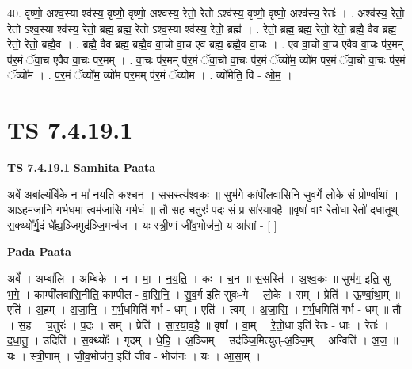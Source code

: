 \documentclass[17pt]{extarticle}
\begin{document}
40. वृष्णो॒ अश्व॒स्या श्व॑स्य॒ वृष्णो॒ वृष्णो॒ अश्व॑स्य॒ रेतो॒ रेतो ऽश्व॑स्य॒ वृष्णो॒ वृष्णो॒ अश्व॑स्य॒ रेतः॑ । . अश्व॑स्य॒ रेतो॒ रेतो ऽश्व॒स्या श्व॑स्य॒ रेतो॒ ब्रह्म॒ ब्रह्म॒ रेतो ऽश्व॒स्या श्व॑स्य॒ रेतो॒ ब्रह्म॑ । . रेतो॒ ब्रह्म॒ ब्रह्म॒ रेतो॒ रेतो॒ ब्रह्मै॒ वैव ब्रह्म॒ रेतो॒ रेतो॒ ब्रह्मै॒व । . ब्रह्मै॒ वैव ब्रह्म॒ ब्रह्मै॒व वा॒चो वा॒च ए॒व ब्रह्म॒ ब्रह्मै॒व वा॒चः । . ए॒व वा॒चो वा॒च ए॒वैव वा॒चः प॑र॒मम् प॑र॒मं ॅवा॒च ए॒वैव वा॒चः प॑र॒मम् । . वा॒चः प॑र॒मम् प॑र॒मं ॅवा॒चो वा॒चः प॑र॒मं ॅव्यो॑म॒ व्यो॑म पर॒मं ॅवा॒चो वा॒चः प॑र॒मं ॅव्यो॑म । . प॒र॒मं ॅव्यो॑म॒ व्यो॑म पर॒मम् प॑र॒मं ॅव्यो॑म । . व्यो॑मेति॒ वि - ओ॒म॒ । \newline
\pagebreak
{}

\section{ TS 7.4.19.1 }

\textbf{TS 7.4.19.1 } \newline
\textbf{Samhita Paata} \newline

अबें॒ अबां॒ल्यंबि॑के॒ न मा॑ नयति॒ कश्च॒न । स॒सस्त्य॑श्व॒कः ॥ सुभ॑गे॒ कांपी॑लवासिनि सुव॒र्गे लो॒के सं प्रोर्ण्वा॑थां ।आऽहम॑जानि गर्भ॒धमा त्वम॑जासि गर्भ॒धं ॥ तौ स॒ह च॒तुरः॑ प॒दः सं प्र सा॑रयावहै ॥वृषा॑ वाꣳ रेतो॒धा रेतो॑ दधा॒तूथ् स॒क्थ्यो᳚र्गृ॒दं धे᳚ह्य॒ञ्जिमुद॑ञ्जि॒मन्व॑ज । यः स्त्री॒णां जी॑व॒भोज॑नो॒ य आ॑सां - [  ] \newline

\textbf{Pada Paata} \newline

अबें᳚ । अम्बा॑लि । अम्बि॑के । न । मा॒ । न॒य॒ति॒ । कः । च॒न ॥ स॒सस्ति॑ । अ॒श्व॒कः ॥ सुभ॑ग॒ इति॒ सु - भ॒गे॒ । काम्पी॑लवासि॒नीति॒ काम्पी॑ल - वा॒सि॒नि॒ । सु॒व॒र्ग इति॑ सुवः-गे । लो॒के । सम् । प्रेति॑ । ऊ॒र्ण्वा॒था॒म् ॥ एति॑ । अ॒हम् । अ॒जा॒नि॒ । ग॒र्भ॒धमिति॑ गर्भ - धम् । एति॑ । त्वम् । अ॒जा॒सि॒ । ग॒र्भ॒धमिति॑ गर्भ - धम् ॥ तौ । स॒ह । च॒तुरः॑ । प॒दः । सम् । प्रेति॑ । सा॒र॒या॒व॒है॒ ॥ वृषा᳚ । वा॒म् । रे॒तो॒धा इति॑ रेतः - धाः । रेतः॑ । द॒धा॒तु॒ । उदिति॑ । स॒क्थ्योः᳚ । गृ॒दम् । धे॒हि॒ । अ॒ञ्जिम् । उद॑ञ्जि॒मित्युत्-अ॒ञ्जि॒म् । अन्विति॑ । अ॒ज॒ ॥ यः । स्त्री॒णाम् । जी॒व॒भोज॑न॒ इति॑ जीव - भोज॑नः । यः । आ॒सा॒म् ।  \newline
\end{document}
